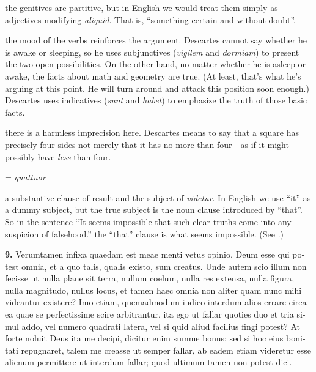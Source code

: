  the genitives are partitive, but in English we would treat them simply as adjectives modifying \textit{aliquid}. That is, ``something certain and without doubt''.

 the mood of the verbs reinforces the argument. Descartes cannot say whether he is awake or sleeping, so he uses subjunctives (\textit{vigilem} and \textit{dormiam}) to present the two open possibilities. On the other hand, no matter whether he is asleep or awake, the facts about math and geometry are true. (At least, that's what he's arguing at this point. He will turn around and attack this position soon enough.) Descartes uses indicatives (\textit{sunt} and \textit{habet}) to emphasize the truth of those basic facts.

 there is a harmless imprecision here. Descartes means to say that a square has precisely four sides not merely that it has no more than four---as if it might possibly have \textit{less} than four.

 = \textit{quattuor}

 a substantive clause of result and the subject of \textit{videtur}. In English we use ``it'' as a dummy subject, but the true subject is the noun clause introduced by ``that''. So in the sentence ``It seems impossible that such clear truths come into any suspicion of falsehood.'' the ``that'' clause is what seems impossible. (See \cite[218]{huddleston2005}.)

\clearpage

\beginnumbering
\pstart
\begin{latin}
    \textenglish{\textbf{9.}} Verumtamen infixa quaedam est meae menti vetus opinio, Deum esse qui potest omnia, et a quo talis, qualis existo, sum creatus. Unde autem scio illum non fecisse ut nulla plane sit terra, nullum coelum, nulla res extensa, nulla figura, nulla magnitudo, nullus locus, et tamen haec omnia non aliter quam nunc mihi videantur existere? Imo etiam, quemadmodum iudico interdum alios errare circa ea quae se perfectissime scire arbitrantur, ita ego ut fallar quoties duo et tria simul addo, vel numero quadrati latera, vel si quid aliud facilius fingi potest? At forte noluit Deus ita me decipi, dicitur enim summe bonus; sed si hoc eius bonitati repugnaret, talem me creasse ut semper fallar, ab eadem etiam videretur esse alienum permittere ut interdum fallar; quod ultimum tamen non potest dici.
\end{latin}
\pend
\endnumbering

